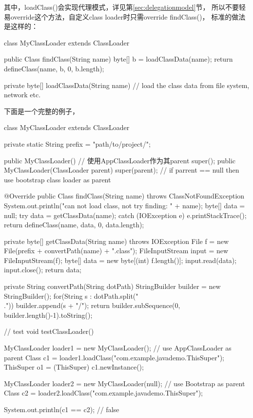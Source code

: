 其中，loadClass()会实现代理模式，详见第\ref{sec:delegationmodel}节，
所以不要轻易override这个方法，自定义class loader时只需override findClass()，
标准的做法是这样的：\\
\begin{javacode}
class MyClassLoader extends ClassLoader {

  public Class findClass(String name) {
    byte[] b = loadClassData(name);
    return defineClass(name, b, 0, b.length);
  }

  private byte[] loadClassData(String name) {
    // load the class data from file system, network etc.
  }
}
\end{javacode}

下面是一个完整的例子，

\begin{javacode}
class MyClassLoader extends ClassLoader {
  private static String prefix = "path/to/project/";

  public MyClassLoader() { // 使用AppClassLoader作为其parent
    super();
  }
  public MyClassLoader(ClassLoader parent) {
    super(parent); // if parrent == null then use bootstrap class loader as parent
  }

  @Override
  public Class findClass(String name) throws ClassNotFoundException {
    System.out.println("can not load class, not try finding: " + name);
    byte[] data = null;
    try {
      data = getClassData(name);
    } catch (IOException e) {
      e.printStackTrace();
    }
    return defineClass(name, data, 0, data.length);
  }

  private byte[] getClassData(String name) throws IOException {
    File f = new File(prefix + convertPath(name) + ".class");
    FileInputStream input = new FileInputStream(f);
    byte[] data = new byte[(int) f.length()];
    input.read(data);
    input.close();
    return data;
  }

  private String convertPath(String dotPath) {
    StringBuilder builder = new StringBuilder();
    for(String s : dotPath.split("\\.")) {
      builder.append(s + "/");
    }
    return builder.subSequence(0, builder.length()-1).toString();
  }
}
// test
void testClassLoader() {
  MyClassLoader loader1 = new MyClassLoader(); // use AppClassLoader as parent
  Class c1 = loader1.loadClass("com.example.javademo.ThisSuper");
  ThisSuper o1 = (ThisSuper) c1.newInstance();

  MyClassLoader loader2 = new MyClassLoader(null); // use Bootstrap as parent
  Class c2 = loader2.loadClass("com.example.javademo.ThisSuper");

  System.out.println(c1 == c2); // false
}
\end{javacode}

